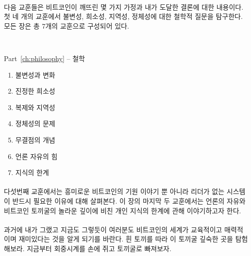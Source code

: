 \paragraph{}
다음 교훈들은 비트코인이 깨뜨린 몇 가지 가정과 내가 도달한 결론에 대한 내용이다. 
첫 네 개의 교훈에서 불변성, 희소성, 지역성, 정체성에 대한 철학적 질문을 탐구한다. 
모든 장은 총 7개의 교훈으로 구성되어 있다.

~

\begin{samepage}
	Part~\ref{ch:philosophy} -- 철학
	
	\begin{enumerate}
		\item 불변성과 변화
		\item 진정한 희소성
		\item 복제와 지역성
		\item 정체성의 문제
		\item 무결점의 개념
		\item 언론 자유의 힘
		\item 지식의 한계
	\end{enumerate}
\end{samepage}

\paragraph{}
다섯번째 교훈에서는 흥미로운 비트코인의 기원 이야기 뿐 아니라 리더가 없는 시스템이 반드시 필요한 이유에 대해 살펴본다. 
이 장의 마지막 두 교훈에서는 언론의 자유와 비트코인 토끼굴의 놀라운 깊이에 비친 개인 지식의 한계에 관해 이야기하고자 한다. 
 
\paragraph{}
과거에 내가 그랬고 지금도 그렇듯이 여러분도 비트코인의 세계가 교육적이고 매력적이며 재미있다는 것을 알게 되기를 바란다. 
흰 토끼를 따라 이 토끼굴 깊숙한 곳을 탐험해보라. 지금부터 회중시계를 손에 쥐고 토끼굴로 빠져보자.
